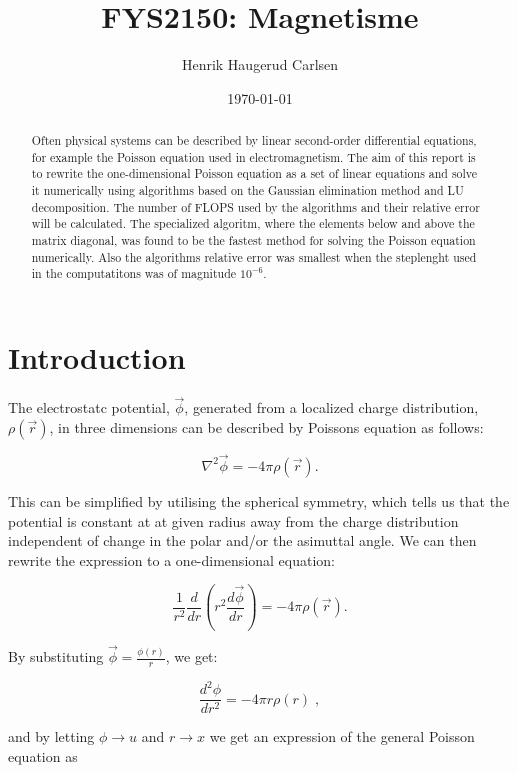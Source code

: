 \documentclass[english,a4paper, 11pt]{article}
\title{FYS2150: Magnetisme}
\author{Henrik Haugerud Carlsen}
\date{\today}
\begin{document}
\maketitle

\begin{abstract}
\centering
Often physical systems can be described by linear second-order differential equations, for example the Poisson equation used in electromagnetism. The aim of this report is to rewrite the one-dimensional Poisson equation as a set of linear equations and solve it numerically using algorithms based on the Gaussian elimination method and LU decomposition. The number of FLOPS used by the algorithms and their relative error will be calculated. 
The specialized algoritm, where the elements below and above the matrix diagonal, was found to be the fastest method for solving the Poisson equation numerically. Also the algorithms relative error was smallest when the steplenght used in the computatitons was of magnitude $10^{-6}$.
\end{abstract}


\section{Introduction}
The electrostatc potential, $\vec{\phi}$, generated from a localized charge distribution, $\rho(\vec{r})$, in three dimensions can be described by Poissons equation as follows:

\begin{equation}
\nabla^2 \vec{\phi} = -4\pi \rho(\vec{r}).
\label{eq1}
\end{equation}

This can be simplified by utilising the spherical symmetry, which tells us that the potential is constant at at given radius away from the charge distribution independent of change in the polar and/or the asimuttal angle. We can then rewrite the expression to a one-dimensional equation:

\begin{equation}
\frac{1}{r^2} \frac{d}{dr} (r^2\frac{d \vec{\phi}}{dr}) = -4\pi\rho(\vec{r}).
\label{eq2}
\end{equation}

By substituting $\vec{\phi} = \frac{\phi(r)}{r}$, we get:

\begin{equation}
\frac{d^2 \phi}{dr^2} = -4 \pi r \rho(r) \;,
\label{eq3}
\end{equation}

and by letting $\phi \rightarrow u$ and $r \rightarrow x$ we get an expression of the general Poisson equation as
\end{document}
